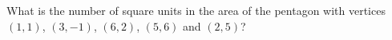 What is the number of square units in the area of the pentagon with vertices $(1,1)$, $(3,-1)$, $(6,2)$, $(5,6)$ and $(2,5)$?
